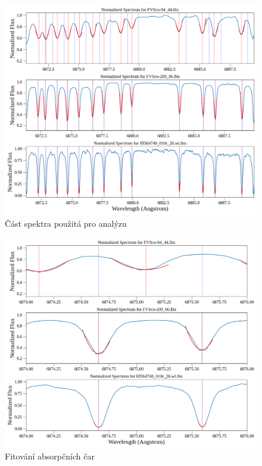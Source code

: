 \documentclass[a4paper,11pt,twocolumn]{article}
\begin{document}
    \begin{figure}
        \centering
        \includegraphics[width=1\textwidth]{spectra_telur.png}
        \caption{Část spektra použitá pro analýzu}
        \label{fig:spectra_telur}
    \end{figure}

    \begin{figure}
        \centering
        \includegraphics[width=1\textwidth]{spectra_lines.png}
        \caption{Fitování absorpčních čar}
        \label{fig:spectra_lines}
    \end{figure}
\end{document}
